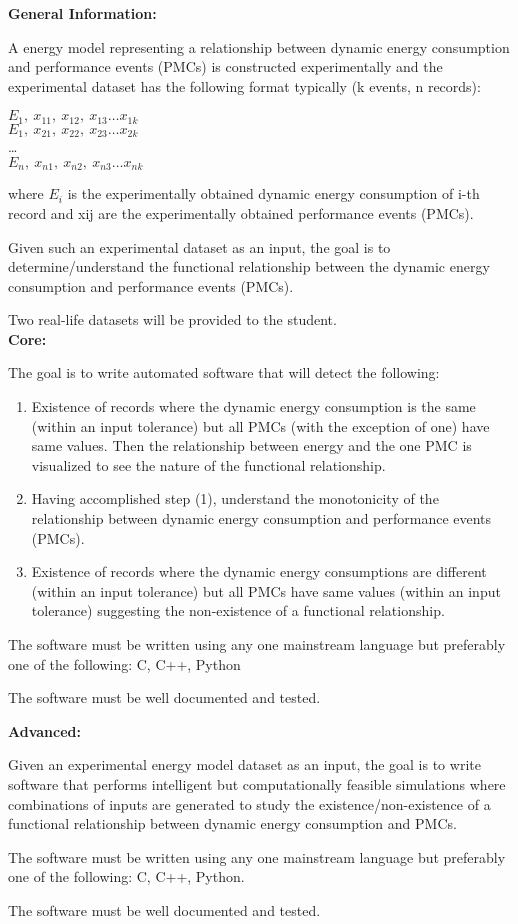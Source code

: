 \textbf{General Information:}

A energy model representing a relationship between dynamic energy consumption and performance events (PMCs) is constructed experimentally and the experimental dataset has the following format typically (k events, n records):

\(E_1,\ x_{11},\ x_{12},\ x_{13} \ldots x_{1k}\)\\
\(E_1,\ x_{21},\ x_{22},\ x_{23} \ldots x_{2k}\)\\
\ldots \\
\(E_n,\ x_{n1},\ x_{n2},\ x_{n3} \ldots x_{nk}\)

where \(E_i\) is the experimentally obtained dynamic energy consumption of i-th record and xij are the experimentally obtained performance events (PMCs).

Given such an experimental dataset as an input, the goal is to determine/understand the functional relationship between the dynamic energy consumption and performance events (PMCs).

Two real-life datasets will be provided to the student.\\
\textbf{Core:}

The goal is to write automated software that will detect the following:
\begin{enumerate}
    \item Existence of records where the dynamic energy consumption is the same (within an input tolerance) but all PMCs (with the exception of one) have same values. Then the relationship between energy and the one PMC is visualized to see the nature of the functional relationship.
    \item Having accomplished step (1), understand the monotonicity of the relationship between dynamic energy consumption and performance events (PMCs).
    \item Existence of records where the dynamic energy consumptions are different (within an input tolerance) but all PMCs have same values (within an input tolerance) suggesting the non-existence of a functional relationship.
\end{enumerate}

The software must be written using any one mainstream language but preferably one of the following:
C, C++, Python

The software must be well documented and tested.

\textbf{Advanced:}

Given an experimental energy model dataset as an input, the goal is to write software that performs intelligent but computationally feasible simulations where combinations of inputs are generated to study the existence/non-existence of a functional relationship between dynamic energy consumption and PMCs.

The software must be written using any one mainstream language but preferably one of the following:
C, C++, Python.

The software must be well documented and tested.